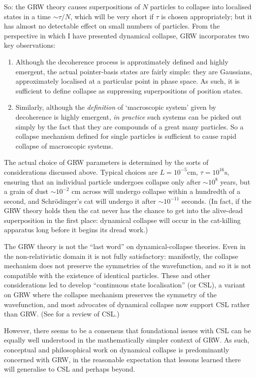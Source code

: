 \documentclass[12pt]{article}
\begin{document}
So: the GRW theory causes superpositions of $N$ particles to collapse into localised states in a time $\sim \tau/N$, which will be very short if $\tau$ is chosen appropriately; but it has almost no detectable effect on small numbers of particles. From the perspective in which I have presented dynamical collapse, GRW incorporates two key observations:
\begin{enumerate}
\item Although the decoherence process is approximately defined and highly emergent, the actual pointer-basis states are fairly simple: they are Gaussians, approximately localised at a particular point in phase space. As such, it is sufficient to define collapse as suppressing superpositions of position states.
\item Similarly, although the \emph{definition} of `macroscopic system' given by decoherence is highly emergent, \emph{in practice} such systems can be picked out simply by the fact that they are compounds of a great many particles. So a collapse mechanism defined for single particles is sufficient to cause rapid collapse of macroscopic systems.
\end{enumerate}
The actual choice of GRW parameters is determined by the sorts of considerations discussed above. Typical choices are $L=10^{-5} \mathrm{cm}$, $\tau=10^{16} \mathrm{s}$, ensuring that an individual particle undergoes collapse only after $\sim 10^8$ years, but a grain of dust $\sim 10^{-2}$ cm across will undergo collapse within a hundredth of a second, and Schr\"{o}dinger's cat will undergo it after $\sim 10^{-11}$ seconds. (In fact, if the GRW theory holds then the cat never has the chance to get into the alive-dead superposition in the first place: dynamical collapse will occur in the cat-killing apparatus long before it begins its dread work.)

The GRW theory is not the ``last word'' on dynamical-collapse theories. Even in the non-relativistic domain it is not fully satisfactory: manifestly, the collapse mechanism does not preserve the symmetries of the wavefunction, and so it is not compatible with the existence of identical particles. These and other considerations led  to develop ``continuous state localisation'' (or CSL), a variant on GRW where the collapse mechanism preserves the symmetry of the wavefunction, and most advocates of dynamical collapse now support CSL rather than GRW. (See  for a review of CSL.)

However, there seems to be a consensus  that foundational issues with CSL can be equally well understood in the mathematically simpler context of GRW. As such, conceptual and philosophical work on dynamical collapse is predominantly concerned with GRW, in the reasonable expectation that lessons learned there will generalise to CSL and perhaps beyond.
\end{document}
